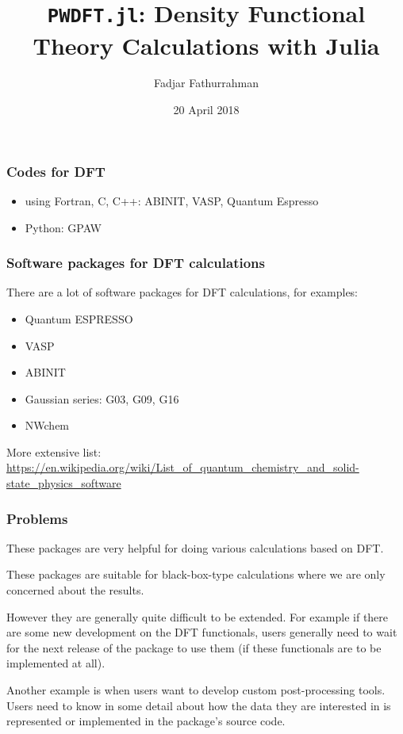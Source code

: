 \documentclass[english,9pt]{beamer}
\begin{document}
\title{\texttt{PWDFT.jl}: Density Functional Theory Calculations with Julia}
\author{Fadjar Fathurrahman}
\date{20 April 2018}

\frame{\titlepage}

\begin{frame}
\frametitle{Codes for DFT}

\begin{itemize}
\item using Fortran, C, C++: ABINIT, VASP, Quantum Espresso
\item Python: GPAW
\end{itemize}

\end{frame}

\begin{frame}
\frametitle{Software packages for DFT calculations}

There are a lot of software packages for DFT calculations, for examples:

\begin{itemize}
\item Quantum ESPRESSO
\item VASP
\item ABINIT
\item Gaussian series: G03, G09, G16
\item NWchem
\end{itemize}

More extensive list:
\url{https://en.wikipedia.org/wiki/List_of_quantum_chemistry_and_solid-state_physics_software}


\end{frame}



\begin{frame}
\frametitle{Problems}

These packages are very helpful for doing various calculations based on DFT.

These packages are suitable for black-box-type calculations where we are only concerned about the results.

However they are generally quite difficult to be extended. For example if there are some new development
on the DFT functionals, users generally need to wait for the next release of the package to use them
(if these functionals are to be implemented at all).

Another example is when users want to develop custom post-processing tools. Users need to know in some detail
about how the data they are interested in is represented or implemented in the package's source code.

\end{frame}
\end{document}
